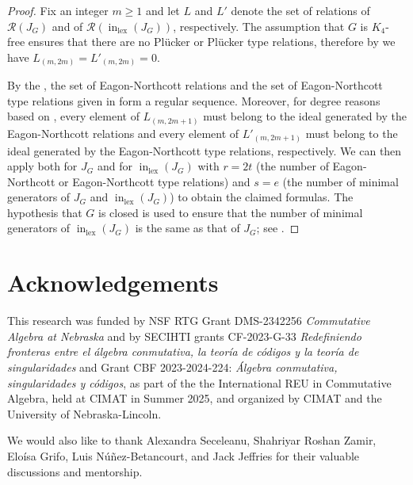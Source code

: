 \documentclass[reqno]{amsart}
\theoremstyle{definition}
\theoremstyle{remark}
\numberwithin{equation}{section}
\newcommand{\R}{\ensuremath{\mathcal{R}}}
\DeclareMathOperator{\init}{in}
\DeclareMathOperator{\lex}{lex}
\begin{document}
\begin{proof}
    Fix an integer $m\geq 1$ and let $L$ and $L'$ denote the set of relations of $\R(J_G)$ and of $\R(\init_{\lex}(J_G))$, respectively. The assumption that $G$ is $K_4$-free ensures that there are no Pl\"ucker or Pl\"ucker type relations, therefore by  we have  $L_{(m,2m)}=L'_{(m,2m)}=0$.
    
    By the , the set of Eagon-Northcott relations and the set of Eagon-Northcott type relations given in  form a regular sequence.  Moreover, 
    for degree reasons based on , every element of $L_{(m,2m+1)}$ must belong to  the ideal generated by the Eagon-Northcott relations and every element of $L'_{(m,2m+1)}$ must belong to the ideal generated by the  Eagon-Northcott type relations, respectively. We can then apply  both for $J_G$ and for $\init_{\lex}(J_G)$ with $r=2t$ (the number of Eagon-Northcott or Eagon-Northcott type relations) and $s=e$ (the number of minimal generators of $J_G$ and $\init_{\lex}(J_G)$) to obtain the claimed formulas. The hypothesis that $G$ is closed is used to ensure that the number of minimal generators of  $\init_{\lex}(J_G)$ is the same as that of $J_G$; see \cite[Theorem 7.2]{HHO}.
\end{proof}


\section{Acknowledgements}
This research was funded by NSF RTG Grant DMS-2342256 \emph{Commutative Algebra at Nebraska} and by SECIHTI grants CF-2023-G-33 \emph{Redefiniendo fronteras entre el álgebra conmutativa, la teoría de códigos y la teoría de singularidades} and Grant CBF 2023-2024-224: \emph{Álgebra conmutativa, singularidades y códigos}, as part of the the International REU in Commutative Algebra, held at CIMAT in Summer 2025, and organized by CIMAT and the University of Nebraska-Lincoln.

We would also like to thank Alexandra Seceleanu, Shahriyar Roshan Zamir, Eloísa Grifo, Luis Núñez-Betancourt, and Jack Jeffries for their valuable discussions and mentorship.



\end{document}
